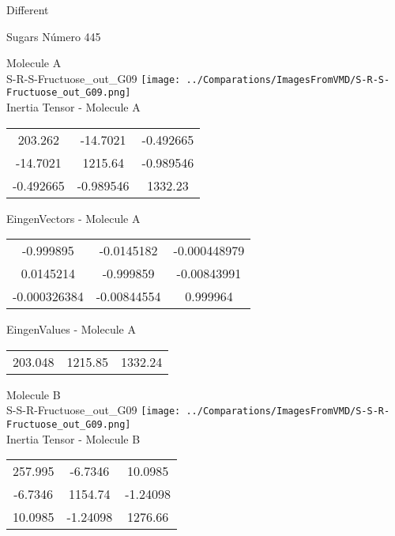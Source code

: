 \begin{center}
\vtab
\vtab
\textcolor{NavyBlue}{\Large Different}
\end{center}

 \newpage

\vtab[-2cm]
\begin{center}
{\large Sugars \tab Número 445}
\end{center}
\begin{multicols}{2}
\begin{center}

Molecule A \\ 
S-R-S-Fructuose\_out\_G09
\texttt{[image: ../Comparations/ImagesFromVMD/S-R-S-Fructuose\_out\_G09.png]}
\\
Inertia Tensor - Molecule A \\
\vtab

\begin{tabular}{|c c c|}
203.262	 & 	-14.7021	 & 	-0.492665	 \\
-14.7021	 & 	1215.64	 & 	-0.989546	 \\
-0.492665	 & 	-0.989546	 & 	1332.23
\end{tabular}

\vtab
 EingenVectors - Molecule A     \\
\vtab
\begin{tabular}{|c c c|}
-0.999895	 & 	-0.0145182	 & 	-0.000448979	 \\
0.0145214	 & 	-0.999859	 & 	-0.00843991	 \\
-0.000326384	 & 	-0.00844554	 & 	0.999964
\end{tabular}

\vtab
 EingenValues - Molecule A     \\
\vtab
\begin{tabular}{|c c c|}
203.048	 & 	1215.85	 & 	1332.24	 \\
\end{tabular}
\columnbreak

Molecule B \\ 
S-S-R-Fructuose\_out\_G09
\texttt{[image: ../Comparations/ImagesFromVMD/S-S-R-Fructuose\_out\_G09.png]}
\\
Inertia Tensor - Molecule B \\
\vtab

\begin{tabular}{|c c c|}
257.995	 & 	-6.7346	 & 	10.0985	 \\
-6.7346	 & 	1154.74	 & 	-1.24098	 \\
10.0985	 & 	-1.24098	 & 	1276.66
\end{tabular}


\end{center}
\end{multicols}

